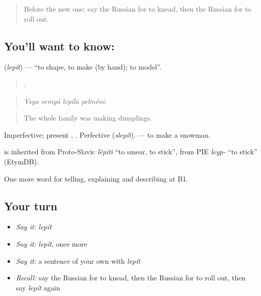 \label{lesson:RU-C331-lepit}



\begin{quote}
Before the new one: say the Russian for to knead, then the Russian for to roll out.
\end{quote}

\subsection*{You'll want to know: }
\textbf{} (\emph{lepít}) — \textquotedblleft{}to shape, to make (by hand); to model\textquotedblright{}.

\begin{quote}
   .
\end{quote}

\begin{quote}
\emph{Vsya semyá lepíla pelméni.}
\end{quote}

\begin{quote}
The whole family was making dumplings.
\end{quote}

Imperfective; present \emph{}, \emph{}. Perfective \emph{} (\emph{slepít}). \emph{ } — to make a snowman.

\begin{cousinweb}
\emph{} is inherited from Proto-Slavic \emph{lěpiti} \textquotedblleft{}to smear, to stick\textquotedblright{}, from PIE \emph{leyp-} \textquotedblleft{}to stick\textquotedblright{} (EtymDB).
\end{cousinweb}

\begin{grammarlens}[title={What you've built}]
One more word for telling, explaining and describing at B1.
\end{grammarlens}

\subsection*{Your turn}
\begin{itemize}
\raggedright
  \item \emph{Say it:} \emph{lepít}
  \item \emph{Say it:} \emph{lepít}, once more
  \item \emph{Say it:} a sentence of your own with \emph{lepít}
  \item \emph{Recall:} say the Russian for to knead, then the Russian for to roll out, then say \emph{lepít} again
\end{itemize}

